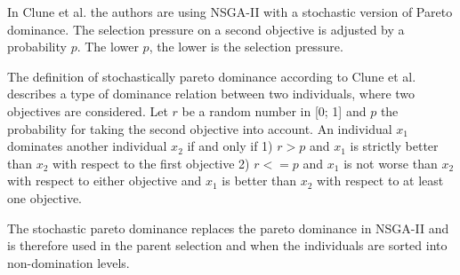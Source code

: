     In Clune et al.\cite{clune2013evolutionary} the authors are using NSGA-II with a stochastic version of Pareto dominance. The selection pressure on a second objective is adjusted by a probability $p$. The lower $p$, the lower is the selection pressure.
    
    The definition of stochastically pareto dominance according to Clune et al.\cite{clune2013evolutionary} describes a type of dominance relation between two individuals, where two objectives are considered. Let $r$ be a random number in [0; 1] and $p$ the probability for taking the second objective into account. An individual $x_1$ dominates another individual $x_2$ if and only if 1) $r>p$ and $x_1$ is strictly better than $x_2$ with respect to the first objective 2) $r<=p$ and $x_1$ is not worse than $x_2$ with respect to either objective and $x_1$ is better than $x_2$ with respect to at least one objective.
    
    The stochastic pareto dominance replaces the pareto dominance in NSGA-II and is therefore used in the parent selection and when the individuals are sorted into non-domination levels.